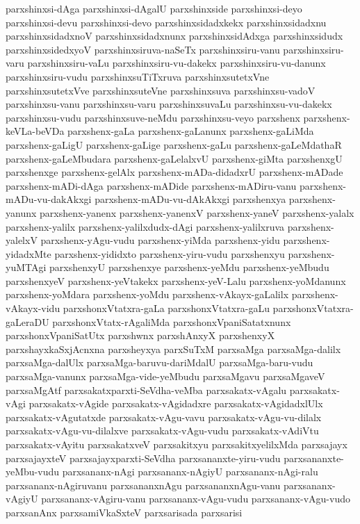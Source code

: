 {parxshinxsi-dAga
parxshinxsi-dAgalU
parxshinxside
parxshinxsi-deyo
parxshinxsi-devu
parxshinxsi-devo
parxshinxsidadxkekx
parxshinxsidadxnu
parxshinxsidadxnoV
parxshinxsidadxnunx
parxshinxsidAdxga
parxshinxsidudx
parxshinxsidedxyoV
parxshinxsiruva-naSeTx
parxshinxsiru-vanu
parxshinxsiru-varu
parxshinxsiru-vaLu
parxshinxsiru-vu-dakekx
parxshinxsiru-vu-danunx
parxshinxsiru-vudu
parxshinxsuTiTxruva
parxshinxsutetxVne
parxshinxsutetxVve
parxshinxsuteVne
parxshinxsuva
parxshinxsu-vadoV
parxshinxsu-vanu
parxshinxsu-varu
parxshinxsuvaLu
parxshinxsu-vu-dakekx
parxshinxsu-vudu
parxshinxsuve-neMdu
parxshinxsu-veyo
parxshenx
parxshenx-keVLa-beVDa
parxshenx-gaLa
parxshenx-gaLanunx
parxshenx-gaLiMda
parxshenx-gaLigU
parxshenx-gaLige
parxshenx-gaLu
parxshenx-gaLeMdathaR
parxshenx-gaLeMbudara
parxshenx-gaLelalxvU
parxshenx-giMta
parxshenxgU
parxshenxge
parxshenx-gelAlx
parxshenx-mADa-didadxrU
parxshenx-mADade
parxshenx-mADi-dAga
parxshenx-mADide
parxshenx-mADiru-vanu
parxshenx-mADu-vu-dakAkxgi
parxshenx-mADu-vu-dAkAkxgi
parxshenxya
parxshenx-yanunx
parxshenx-yanenx
parxshenx-yanenxV
parxshenx-yaneV
parxshenx-yalalx
parxshenx-yalilx
parxshenx-yalilxdudx-dAgi
parxshenx-yalilxruva
parxshenx-yalelxV
parxshenx-yAgu-vudu
parxshenx-yiMda
parxshenx-yidu
parxshenx-yidadxMte
parxshenx-yididxto
parxshenx-yiru-vudu
parxshenxyu
parxshenx-yuMTAgi
parxshenxyU
parxshenxye
parxshenx-yeMdu
parxshenx-yeMbudu
parxshenxyeV
parxshenx-yeVtakekx
parxshenx-yeV-Lalu
parxshenx-yoMdanunx
parxshenx-yoMdara
parxshenx-yoMdu
parxshenx-vAkayx-gaLalilx
parxshenx-vAkayx-vidu
parxshonxVtatxra-gaLa
parxshonxVtatxra-gaLu
parxshonxVtatxra-gaLeraDU
parxshonxVtatx-rAgaliMda
parxshonxVpaniSatatxnunx
parxshonxVpaniSatUtx
parxshwnx
parxshAnxyX
parxshenxyX
parxshayxkaSxjAcnxna
parxsheyxya
parxSuTxM
parxsaMga
parxsaMga-dalilx
parxsaMga-dalUlx
parxsaMga-baruvu-dariMdalU
parxsaMga-baru-vudu
parxsaMga-vanunx
parxsaMga-vide-yeMbudu
parxsaMgavu
parxsaMgaveV
parxsaMgAtf
parxsakatxparxti-SeVdha-veMba
parxsakatx-vAgalu
parxsakatx-vAgi
parxsakatx-vAgide
parxsakatx-vAgidadxre
parxsakatx-vAgidadxlUlx
parxsakatx-vAgutatxde
parxsakatx-vAgu-vavu
parxsakatx-vAgu-vu-dilalx
parxsakatx-vAgu-vu-dilalxve
parxsakatx-vAgu-vudu
parxsakatx-vAdiVtu
parxsakatx-vAyitu
parxsakatxveV
parxsakitxyu
parxsakitxyelilxMda
parxsajayx
parxsajayxteV
parxsajayxparxti-SeVdha
parxsananxte-yiru-vudu
parxsananxte-yeMbu-vudu
parxsananx-nAgi
parxsananx-nAgiyU
parxsananx-nAgi-ralu
parxsananx-nAgiruvanu
parxsananxnAgu
parxsananxnAgu-vanu
parxsananx-vAgiyU
parxsananx-vAgiru-vanu
parxsananx-vAgu-vudu
parxsananx-vAgu-vudo
parxsanAnx
parxsamiVkaSxteV
parxsarisada
parxsarisi
}
